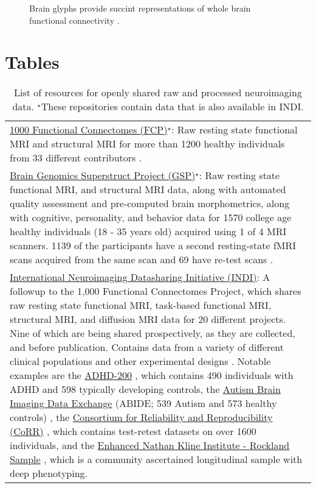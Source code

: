 \documentclass{bmcart}
\begin{document}
\begin{backmatter}
\begin{figure}[h!]
  \caption{ Brain glyphs provide succint representations of whole brain functional connectivity \cite{Bottger2014}. }
      \end{figure}
	  
\section*{Tables}

\renewcommand{\arraystretch}{1.5}

\begin{table}[h!]
\caption{List of resources for openly shared raw and processed neuroimaging data. $^{\star}$These repositories contain data that is also available in INDI.}
\label{Table1}
      \begin{tabular}{L{5.5in}}
        \hline
        \href{http://fcon_1000.projects.nitrc.org}{1000 Functional Connectomes (FCP)}$^{\star}$: Raw resting state functional MRI and structural MRI for more than 1200 healthy individuals from 33 different contributors \cite{Biswal2010}. \\ 
		\href{https://thedata.harvard.edu/dvn/dv/GSP}{Brain Genomics Superstruct Project (GSP)}$^{\star}$: Raw resting state functional MRI, and structural MRI data, along with automated quality assessment and pre-computed brain morphometrics, along with cognitive, personality, and behavior data for 1570 college age healthy individuals (18 - 35 years old) acquired using 1 of 4 MRI scanners. 1139 of the participants have a second resting-state fMRI scans acquired from the same scan and 69 have re-test scans \cite{BucknerGSP2014}.\\
		\href{http://fcon_1000.projects.nitrc.org}{International Neuroimaging Datasharing Initiative (INDI)}: A followup to the 1,000 Functional Connectomes Project, which shares raw resting state functional MRI, task-based functional MRI, structural MRI, and diffusion MRI data for 20 different projects. Nine of which are being shared prospectively, as they are collected, and before publication. Contains data from a variety of different clinical populations and other experimental designs \cite{Mennes2013}. Notable examples are the \href{http://fcon_1000.projects.nitrc.org/indi/adhd200}{ADHD-200} \cite{Milham2012adhd}, which contains 490 individuals with ADHD and 598 typically developing controls, the \href{http://fcon_1000.projects.nitrc.org/indi/abide}{Autism Brain Imaging Data Exchange} (ABIDE; 539 Autism and 573 healthy controls) \cite{DiMartino2014}, the \href{http://fcon_1000.projects.nitrc.org/indi/CoRR/html/}{Consortium for Reliability and Reproducibility (CoRR)} \cite{Zuo2014}, which contains test-retest datasets on over 1600 individuals, and the \href{http://fcon_1000.projects.nitrc.org/indi/enhanced/}{Enhanced Nathan Kline Institute - Rockland Sample} \cite{Nooner2012}, which is a community ascertained longitudinal sample with deep phenotyping. \\

\end{tabular}
\end{table}
\end{backmatter}
\end{document}
